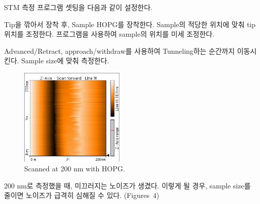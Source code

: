 \documentclass[a4paper, 10pt, nanum]{CSUniSchoolLabReport}
\begin{document}
	STM 측정 프로그램 셋팅을 다음과 같이 설정한다.
	
	\begin{table}[htb!]
		\label{tab:2}
		\centering
	\end{table}

	Tip을 깎아서 장착 후, Sample HOPG를 장착한다. Sample의 적당한 위치에 맞춰 tip 위치를 조정한다. 프로그램을 사용하여 sample의 위치를 미세 조정한다.

	Advanced/Retract, approach/withdraw를 사용하여 Tunneling하는 순간까지 이동시킨다. Sample size에 맞춰 측정한다.

	\begin{figure}[htb!]
		\centering
		\includegraphics[width=5cm]{Figures/Scan_200nm.jpg}
		\caption{Scanned at 200 nm with HOPG.}
		\label{fig:Scan_200nm}
	\end{figure}

	200 nm로 측정했을 때, 미끄러지는 노이즈가 생겼다. 이렇게 될 경우, sample size를 줄이면 노이즈가 급격히 심해질 수 있다. (Figures~4)
\end{document}
